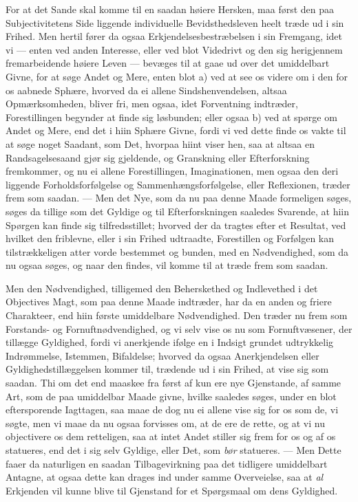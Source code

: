 \documentclass[12pt,a4paper]{book}
\newcommand{\apage}[1]{\marginnote{\footnotesize\textit{[#1]}}}
\begin{document}
For at det Sande skal komme til en saadan høiere \apage{13}  Hersken, maa først den paa
Subjectivitetens Side liggende individuelle Bevidsthedsleven heelt træde ud i sin
Frihed. Men hertil fører da ogsaa Erkjendelsesbestræbelsen i sin Fremgang, idet
vi --- enten ved anden Interesse, eller ved blot Videdrivt og den sig
herigjennem fremarbeidende høiere Leven --- bevæges til at gaae ud over det
umiddelbart Givne, for at søge Andet og Mere, enten blot a) ved at see os videre
om i den for os aabnede Sphære, hvorved da ei allene Sindshenvendelsen, altsaa
Opmærksomheden, bliver fri, men ogsaa, idet Forventning indtræder, Forestillingen
begynder at finde sig løsbunden; eller ogsaa b) ved at spørge om Andet og Mere,
end det i hiin Sphære Givne, fordi vi ved dette finde os vakte til at søge noget
Saadant, som Det, hvorpaa hiint viser hen, saa at altsaa en Randsagelsesaand gjør
sig gjeldende, og Granskning eller Efterforskning fremkommer, og nu ei allene
Forestillingen, Imaginationen, men ogsaa den deri liggende Forholdsforfølgelse og
Sammenhængsforfølgelse, eller Reflexionen, træder frem som saadan. --- Men det
Nye, som da nu paa denne Maade formeligen søges, søges da tillige som det Gyldige
og til Efterforskningen saaledes Svarende, at hiin Spørgen kan finde sig
tilfredsstillet; hvorved der da tragtes efter et Resultat, ved hvilket den
friblevne, eller i sin Frihed udtraadte, Forestillen og Forfølgen kan
tilstrækkeligen atter vorde bestemmet og bunden, med en Nødvendighed, som da nu
ogsaa søges, og naar den findes, vil komme til at træde frem som saadan.

Men den Nødvendighed, tilligemed den Beherskethed og Indlevethed i det Objectives
Magt, som paa denne Maade indtræder, har da en anden og friere Charakteer, end
hiin første umiddelbare Nødvendighed. Den træder nu frem som Forstands- og
Fornuftnødvendighed, og vi selv vise os nu som Fornuftvæsener, der tillægge
Gyldighed, fordi vi anerkjende ifølge en i Indsigt grundet udtrykkelig \apage{14} 
Indrømmelse, Istemmen, Bifaldelse; hvorved da ogsaa Anerkjendelsen eller
Gyldighedstillæggelsen kommer til, trædende ud i sin Frihed, at vise sig som
saadan. Thi om det end maaskee fra først af kun ere nye Gjenstande, af samme Art,
som de paa umiddelbar Maade givne, hvilke saaledes søges, under en blot
eftersporende Iagttagen, saa maae de dog nu ei allene vise sig for os som de, vi
søgte, men vi maae da nu ogsaa forvisses om, at de ere de rette, og at vi nu
objectivere os dem retteligen, saa at intet Andet stiller sig frem for os og af
os statueres, end det i sig selv Gyldige, eller Det, som \emph{bør} statueres.
--- Men Dette faaer da naturligen en saadan Tilbagevirkning paa det tidligere
umiddelbart Antagne, at ogsaa dette kan drages ind under samme Overveielse, saa
at \emph{al} Erkjenden vil kunne blive til Gjenstand for et Spørgsmaal om dens
Gyldighed.
\end{document}
